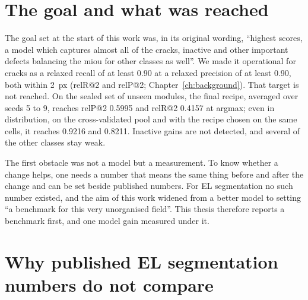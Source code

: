 \section{The goal and what was reached}\label{sec:intro-goal}

The goal set at the start of this work was, in its original wording, ``highest scores, a model which captures almost all of the
cracks, inactive and other important defects balancing the miou for other classes as well''. We made it operational for cracks as
a relaxed recall of at least 0.90 at a relaxed precision of at least 0.90, both within 2~px (relR@2 and relP@2;
Chapter~\ref{ch:background}). That target is not reached. On the sealed set of unseen modules, the final recipe, averaged over
seeds 5 to 9, reaches relP@2 0.5995 and relR@2 0.4157 at argmax; even in distribution, on the cross-validated pool and with the
recipe chosen on the same cells, it reaches 0.9216 and 0.8211. Inactive gains are not detected, and several of the other classes stay weak.

The first obstacle was not a model but a measurement. To know whether a change helps, one needs a number that means the same thing
before and after the change and can be set beside published numbers. For EL segmentation no such number existed, and the aim of
this work widened from a better model to setting ``a benchmark for this very unorganised field''. This thesis therefore reports a
benchmark first, and one model gain measured under it.

\section{Why published EL segmentation numbers do not compare}\label{sec:intro-why}

